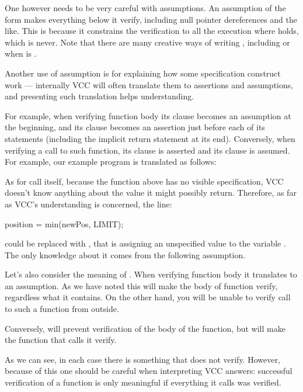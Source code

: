 One however needs to be very careful with assumptions.
An assumption of the form  makes everything below
it verify, including null pointer dereferences and the like.
This is because it constrains the verification to all the execution
where \vcc{\false} holds, which is never.
Note that there are many creative ways of writing \vcc{\false}, including
 or  when  is .

Another use of assumption is for explaining how some specification construct work ---
internally VCC will often translate them to assertions and assumptions, and presenting
such translation helps understanding.

For example, when verifying function body
its  clause becomes an assumption at the beginning, and its
 clause becomes an assertion just before each of its  statements
(including the implicit return statement at its end).
Conversely, when verifying a call to such function, its  clause is asserted
and its  clause is assumed. For example, our example program is translated
as follows:


As for call itself, because the  function above has no visible specification,
VCC doesn't know anything about the value it might possibly return.
Therefore, as far as VCC's understanding is concerned, the line:
\begin{VCC}
position = min(newPos, LIMIT);
\end{VCC}
could be replaced with , that is assigning an unspecified value
to the variable . 
The only knowledge about it comes from the following assumption.

Let's also consider the meaning of .
When verifying function body it translates to an assumption.
As we have noted this will make the body of function verify,
regardless what it contains.
On the other hand, you will be unable to verify call to such a function
from outside.

Conversely,  will prevent verification
of the body of the function, but will make the function that calls
it verify.

As we can see, in each case there is something that does not verify.
However, because of this one should be careful when interpreting
VCC answers: successful verification of a function is only meaningful
if everything it calls was verified.

